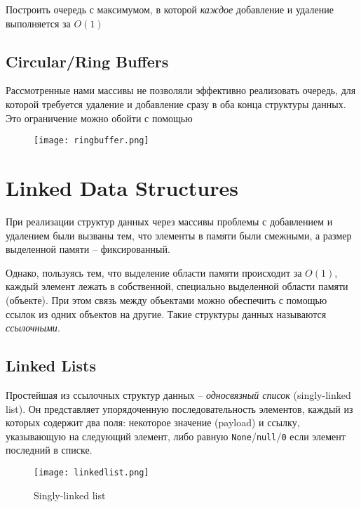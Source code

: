 \begin{problem}
Построить очередь с максимумом, в которой {\em каждое} добавление и удаление выполняется за $O(1)$
\end{problem}

\subsection*{Circular/Ring Buffers}

Рассмотренные нами массивы не позволяли эффективно реализовать очередь, для которой требуется удаление и добавление сразу в оба конца структуры данных. Это ограничение можно обойти с помощью 

\begin{figure}[!ht]
\centering
\texttt{[image: ringbuffer.png]}
\end{figure}


\section{Linked Data Structures}

При реализации структур данных через массивы проблемы с добавлением и удалением были вызваны тем, что элементы в памяти были смежными, а размер выделенной памяти -- фиксированный.

Однако, пользуясь тем, что выделение области памяти происходит за $O(1)$, каждый элемент лежать в собственной, специально выделенной области памяти (объекте). При этом связь между объектами можно обеспечить с помощью ссылок из одних объектов на другие. Такие структуры данных называются {\em ссылочными}.

\subsection*{Linked Lists}

Простейшая из ссылочных структур данных -- {\em односвязный список} (singly-linked list). Он представляет упорядоченную последовательность элементов, каждый из которых содержит два поля: некоторое значение (payload) и ссылку, указывающую на следующий элемент, либо равную {\tt None}/{\tt null}/{\tt 0} если элемент последний в списке.

\begin{figure}[!ht]
\centering
\texttt{[image: linkedlist.png]}
\caption{Singly-linked list}
\end{figure}

